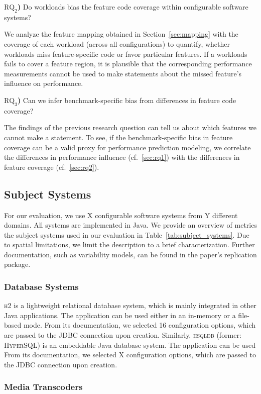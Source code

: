 \documentclass[conference]{IEEEtran}
\newcommand{\greybox}[1]{
	\begin{mdframed}[
		backgroundcolor=MidnightBlue!10,
		linewidth=0pt,
		innerleftmargin=5pt,
		innertopmargin=5pt,
		roundcorner=3pt,
		]
		#1
	\end{mdframed}
}
\begin{document}
\greybox{\textbf{$\text{RQ}_2$)} Do workloads bias the feature code coverage within configurable software systems?}
We analyze the feature mapping obtained in Section~\ref{sec:mapping} with the coverage of each workload (across all configurations) to quantify, whether workloads miss feature-specific code or favor particular features. If a workloads fails to cover a feature region, it is plausible that the corresponding performance measurements cannot be used to make statements about the missed feature's influence on performance.

\greybox{\textbf{$\text{RQ}_3$)} Can we infer benchmark-specific bias from differences in feature code coverage?}
The findings of the previous research question can tell us about which features we cannot make a statement. To see, if the benchmark-specific bias in feature coverage can be a valid proxy for performance prediction modeling, we correlate the differences in performance influence (cf.~\ref{sec:rq1}) with the differences in feature coverage (cf.~\ref{sec:rq2}).

\subsection{Subject Systems}
For our evaluation, we use {\color{red}X} configurable software systems from {\color{red}Y} different domains. All systems are implemented in Java. We provide an overview of metrics the subject systems used in our evaluation in Table~\ref{tab:subject_systems}. Due to spatial limitations, we limit the description to a brief characterization. Further documentation, such as variability models, can be found in the paper's replication package.

\subsubsection{Database Systems}
\textsc{h2} is a lightweight relational database system, which is mainly integrated in other Java applications. The application can be used either in an in-memory or a file-based mode. From its documentation, we selected 16 configuration options, which are passed to the JDBC connection upon creation.
Similarly, \textsc{hsqldb} (former: \textsc{HyperSQL}) is an embeddable Java database system. The application can be used From its documentation, we selected {\color{red}X} configuration options, which are passed to the JDBC connection upon creation.

\subsubsection{Media Transcoders}
\end{document}
